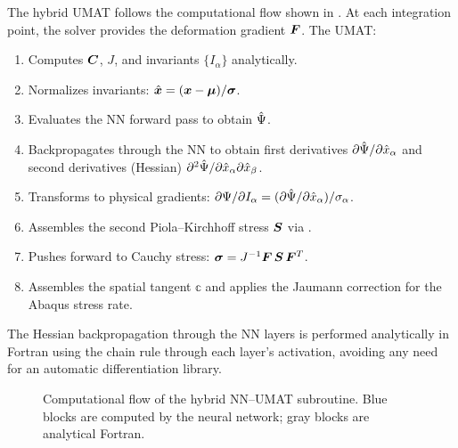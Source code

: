 The hybrid UMAT follows the computational flow shown in
.  At each integration point, the solver provides the
deformation gradient $\bm{F}$.  The UMAT:

\begin{enumerate}
  \item Computes $\bm{C}$, $J$, and invariants $\{I_\alpha\}$ analytically.
  \item Normalizes invariants: $\hat{\bm{x}} = (\bm{x} - \bm{\mu}) / \bm{\sigma}$.
  \item Evaluates the NN forward pass to obtain $\hat{\Psi}$.
  \item Backpropagates through the NN to obtain first derivatives
    $\partial\hat{\Psi}/\partial\hat{x}_\alpha$ and second derivatives
    (Hessian) $\partial^2\hat{\Psi}/\partial\hat{x}_\alpha\partial\hat{x}_\beta$.
  \item Transforms to physical gradients:
    $\partial\Psi/\partial I_\alpha = (\partial\hat{\Psi}/\partial\hat{x}_\alpha) / \sigma_\alpha$.
  \item Assembles the second Piola--Kirchhoff stress $\bm{S}$ via
    .
  \item Pushes forward to Cauchy stress:
    $\bm{\sigma} = J^{-1}\bm{F}\,\bm{S}\,\bm{F}^T$.
  \item Assembles the spatial tangent $\mathbb{c}$ and applies the Jaumann
    correction for the Abaqus stress rate.
\end{enumerate}

The Hessian backpropagation through the NN layers is performed analytically in
Fortran using the chain rule through each layer's activation, avoiding any
need for an automatic differentiation library.

\begin{figure}[htbp]
\centering
\caption{Computational flow of the hybrid NN--UMAT subroutine.  Blue blocks
  are computed by the neural network; gray blocks are analytical Fortran.}
\label{fig:hybrid_umat}
\end{figure}

